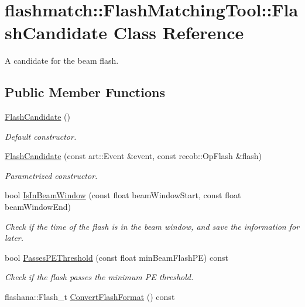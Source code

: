 \hypertarget{classflashmatch_1_1FlashMatchingTool_1_1FlashCandidate}{}\section{flashmatch\+:\+:Flash\+Matching\+Tool\+:\+:Flash\+Candidate Class Reference}
\label{classflashmatch_1_1FlashMatchingTool_1_1FlashCandidate}


A candidate for the beam flash.  


\subsection*{Public Member Functions}
\begin{DoxyCompactItemize}
\item 
\hyperlink{classflashmatch_1_1FlashMatchingTool_1_1FlashCandidate_a2d514815c7f1cd16cec72f45781b9532}{Flash\+Candidate} ()\hypertarget{classflashmatch_1_1FlashMatchingTool_1_1FlashCandidate_a2d514815c7f1cd16cec72f45781b9532}{}\label{classflashmatch_1_1FlashMatchingTool_1_1FlashCandidate_a2d514815c7f1cd16cec72f45781b9532}

\begin{DoxyCompactList}\small\item\em Default constructor. \end{DoxyCompactList}\item 
\hyperlink{classflashmatch_1_1FlashMatchingTool_1_1FlashCandidate_a95fa2be25e8635d56d6768b2886fa821}{Flash\+Candidate} (const art\+::\+Event \&event, const recob\+::\+Op\+Flash \&flash)
\begin{DoxyCompactList}\small\item\em Parametrized constructor. \end{DoxyCompactList}\item 
bool \hyperlink{classflashmatch_1_1FlashMatchingTool_1_1FlashCandidate_abe37a111abddadacef277af4f8adda44}{Is\+In\+Beam\+Window} (const float beam\+Window\+Start, const float beam\+Window\+End)
\begin{DoxyCompactList}\small\item\em Check if the time of the flash is in the beam window, and save the information for later. \end{DoxyCompactList}\item 
bool \hyperlink{classflashmatch_1_1FlashMatchingTool_1_1FlashCandidate_a43b731e560f75645df5aa5d74f017ba0}{Passes\+P\+E\+Threshold} (const float min\+Beam\+Flash\+PE) const 
\begin{DoxyCompactList}\small\item\em Check if the flash passes the minimum PE threshold. \end{DoxyCompactList}\item 
flashana\+::\+Flash\+\_\+t \hyperlink{classflashmatch_1_1FlashMatchingTool_1_1FlashCandidate_ab8156ee16d27febb44352c4ffd6adf56}{Convert\+Flash\+Format} () const 
\end{DoxyCompactItemize}
